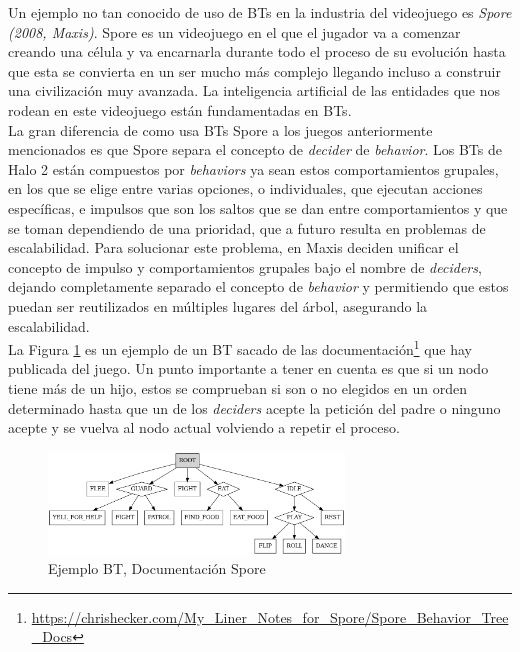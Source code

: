 Un ejemplo no tan conocido de uso de BTs en la industria del videojuego es \textit{Spore (2008, Maxis)}. Spore es un videojuego en el que el jugador va a comenzar creando una célula y va encarnarla durante todo el proceso de su evolución hasta que esta se convierta en un ser mucho más complejo llegando incluso a construir una civilización muy avanzada. La inteligencia artificial de las entidades que nos rodean en este videojuego están fundamentadas en BTs.\\

La gran diferencia de como usa BTs Spore a los juegos anteriormente mencionados es que Spore separa el concepto de \textit{decider} de \textit{behavior}. Los BTs de Halo 2 están compuestos por \textit{behaviors} ya sean estos comportamientos grupales, en los que se elige entre varias opciones, o individuales, que ejecutan acciones específicas, e impulsos que son los saltos que se dan entre comportamientos y que se toman dependiendo de una prioridad, que a futuro resulta en problemas de escalabilidad. Para solucionar este problema, en Maxis deciden unificar el concepto de impulso y comportamientos grupales bajo el nombre de \textit{deciders}, dejando completamente separado el concepto de \textit{behavior} y permitiendo que estos puedan ser reutilizados en múltiples lugares del árbol, asegurando la escalabilidad.\\

La Figura \ref{fig:BT Spore} es un ejemplo de un BT sacado de las documentación\footnote{ \url{https://chrishecker.com/My_Liner_Notes_for_Spore/Spore_Behavior_Tree_Docs}} que hay publicada del juego.
Un punto importante a tener en cuenta es que si un nodo tiene más de un hijo, estos se comprueban si son o no elegidos en un orden determinado hasta que un de los \textit{deciders} acepte la petición del padre o ninguno acepte y se vuelva al nodo actual volviendo a repetir el proceso.\\

\begin{figure}[h]
	\centering
	\includegraphics[width = 0.7\textwidth]{Imagenes/BT_Spoore.png}
	\caption{Ejemplo BT, Documentación Spore}
	\label{fig:BT Spore}
\end{figure}
